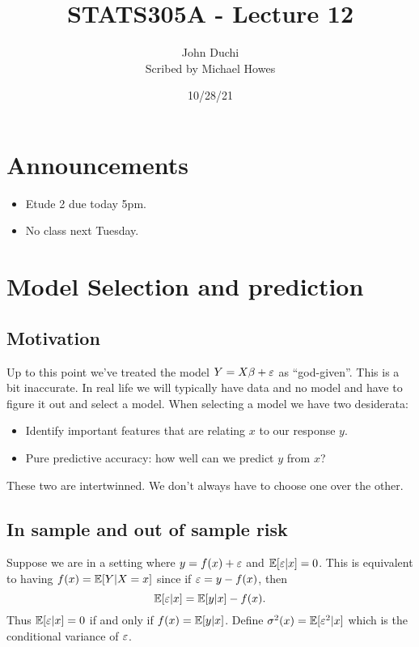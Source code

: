 

\DeclareMathOperator*{\bias}{Bias}


\title{STATS305A - Lecture 12}
\author{John Duchi\\ Scribed by Michael Howes}
\date{10/28/21}

\pagestyle{fancy}
\fancyhf{}


\maketitle
\tableofcontents
\section{Announcements}
\begin{itemize}
    \item Etude 2 due today 5pm.
    \item No class next Tuesday.
\end{itemize}
\section{Model Selection and prediction}
\subsection{Motivation}
Up to this point we've treated the model $Y=X\beta + \varepsilon$ as ``god-given''. This is a bit inaccurate. In real life we will typically have data and no model and have to figure it out and select a model. When selecting a model we have two desiderata:
\begin{itemize}
    \item Identify important features that are relating $x$ to our response $y$.
    \item Pure predictive accuracy: how well can we predict $y$ from $x$?
\end{itemize}
These two are intertwinned. We don't always have to choose one over the other.
\subsection{In sample and out of sample risk}
Suppose we are in a setting where $y = f(x)+\varepsilon$ and ${\mathbb{E}}[\varepsilon|x]=0$. This is equivalent to having $f(x) = {\mathbb{E}}[Y|X=x]$ since if $\varepsilon = y-f(x)$, then \[{\mathbb{E}}[\varepsilon|x] = {\mathbb{E}}[y|x] - f(x).\]
Thus ${\mathbb{E}}[\varepsilon|x]=0$ if and only if $f(x) = {\mathbb{E}}[y|x]$. Define $\sigma^2(x) = {\mathbb{E}}[\varepsilon^2|x]$ which is the conditional variance of $\varepsilon$. 

